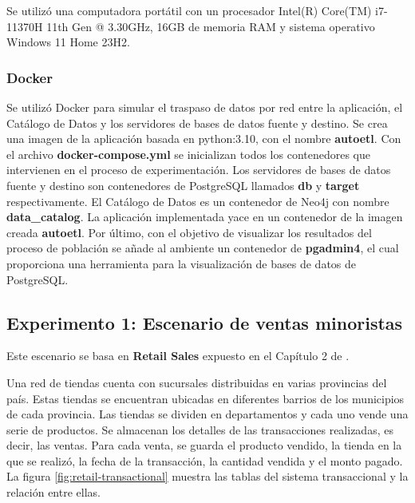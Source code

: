 Se utilizó una computadora portátil con un procesador Intel(R) Core(TM) i7-11370H 11th Gen @ 3.30GHz, 16GB de 
memoria RAM y sistema operativo Windows 11 Home 23H2.

\subsubsection{Docker}

Se utilizó Docker para simular el traspaso de datos por red entre la aplicaci\'on, el Cat\'alogo de Datos y 
los servidores de bases de datos fuente y destino. Se crea una imagen de la aplicaci\'on basada en python:3.10, con el 
nombre \textbf{autoetl}. 
Con el archivo \textbf{docker-compose.yml} se inicializan todos los contenedores que intervienen en el proceso 
de experimentaci\'on. Los servidores de bases de datos fuente y destino son contenedores de PostgreSQL llamados 
\textbf{db} y \textbf{target} respectivamente. El Cat\'alogo de Datos es un contenedor de Neo4j con nombre 
\textbf{data\_catalog}. La aplicaci\'on implementada yace en un contenedor de la imagen creada \textbf{autoetl}. 
Por \'ultimo, con el objetivo de visualizar los resultados del proceso de poblaci\'on se añade al ambiente un 
contenedor de \textbf{pgadmin4}, el cual proporciona una herramienta para la visualizaci\'on de bases de datos 
de PostgreSQL.

\subsection{Experimento 1: Escenario de ventas minoristas}

Este escenario se basa en \textbf{Retail Sales} expuesto en el Cap\'itulo 2
de \cite{kimball2011data}. 

Una red de tiendas cuenta con sucursales distribuidas en varias provincias del país. Estas tiendas se encuentran ubicadas 
en diferentes barrios de los municipios de cada provincia. Las tiendas se dividen en departamentos y cada uno vende 
una serie de productos. Se almacenan los detalles de las transacciones realizadas, es decir, las ventas. Para cada venta, se guarda 
el producto vendido, la tienda en la que se realizó, la fecha de la transacción, la cantidad vendida y el monto pagado.
La figura \ref{fig:retail-transactional} muestra las tablas del sistema transaccional y la relación entre ellas.


